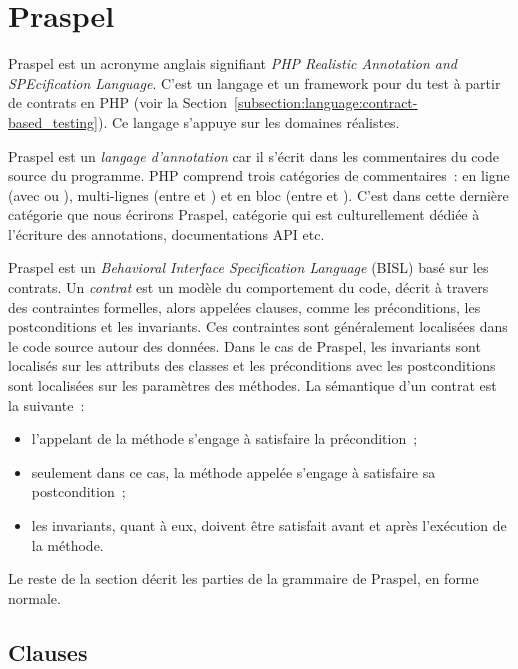 \section{Praspel}
\label{section:language:praspel}

Praspel est un acronyme anglais signifiant {\em PHP Realistic Annotation and
SPEcification Language}. C'est un langage et un framework pour du test à partir
de contrats en PHP (voir la
Section~\ref{subsection:language:contract-based_testing}). Ce langage s'appuye
sur les domaines réalistes.

Praspel est un {\em langage d'annotation} car il s'écrit dans les commentaires
du code source du programme. PHP comprend trois catégories de commentaires~: en
ligne (avec \code{//} ou \code{\#}), multi-lignes (entre \code{/*} et \code{*/})
et en bloc (entre \code{/**} et \code{*/}). C'est dans cette dernière catégorie
que nous écrirons Praspel, catégorie qui est culturellement dédiée à l'écriture
des annotations, documentations API etc.

Praspel est un {\em Behavioral Interface Specification Language} (BISL) basé sur
les contrats. Un {\em contrat} est un modèle du comportement du code, décrit à
travers des contraintes formelles, alors appelées clauses, comme les
préconditions, les postconditions et les invariants. Ces contraintes sont
généralement localisées dans le code source autour des données. Dans le cas de
Praspel, les invariants sont localisés sur les attributs des classes et les
préconditions avec les postconditions sont localisées sur les paramètres des
méthodes. La sémantique d'un contrat est la suivante~:

\begin{itemize}

\item l'appelant de la méthode s'engage à satisfaire la précondition~;

\item seulement dans ce cas, la méthode appelée s'engage à satisfaire sa
postcondition~;

\item les invariants, quant à eux, doivent être satisfait avant et après
l'exécution de la méthode.

\end{itemize}

Le reste de la section décrit les parties de la grammaire de Praspel, en forme
normale.

\subsection{Clauses}
\label{subsection:language:clauses}

